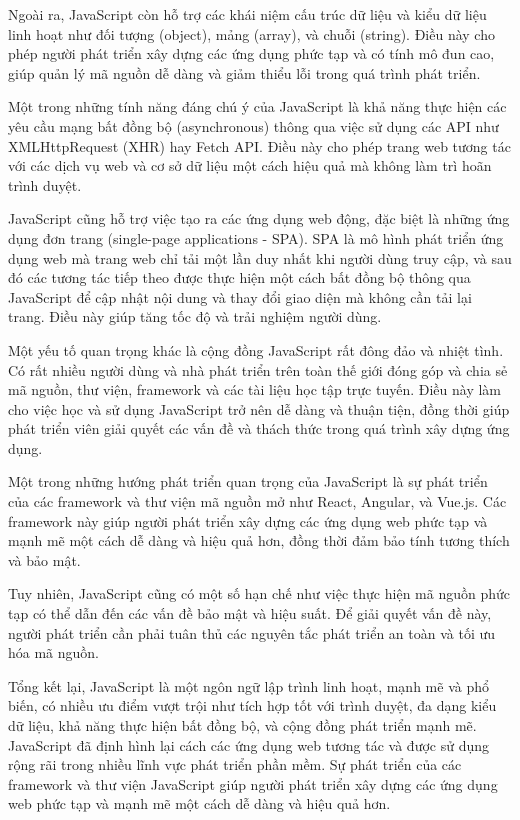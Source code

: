 Ngoài ra, JavaScript còn hỗ trợ các khái niệm cấu trúc dữ liệu và kiểu dữ liệu linh hoạt như đối tượng (object), mảng (array), và chuỗi (string). Điều này cho phép người phát triển xây dựng các ứng dụng phức tạp và có tính mô đun cao, giúp quản lý mã nguồn dễ dàng và giảm thiểu lỗi trong quá trình phát triển.

Một trong những tính năng đáng chú ý của JavaScript là khả năng thực hiện các yêu cầu mạng bất đồng bộ (asynchronous) thông qua việc sử dụng các API như XMLHttpRequest (XHR) hay Fetch API. Điều này cho phép trang web tương tác với các dịch vụ web và cơ sở dữ liệu một cách hiệu quả mà không làm trì hoãn trình duyệt. \cite{js_2}

JavaScript cũng hỗ trợ việc tạo ra các ứng dụng web động, đặc biệt là những ứng dụng đơn trang (single-page applications - SPA). SPA là mô hình phát triển ứng dụng web mà trang web chỉ tải một lần duy nhất khi người dùng truy cập, và sau đó các tương tác tiếp theo được thực hiện một cách bất đồng bộ thông qua JavaScript để cập nhật nội dung và thay đổi giao diện mà không cần tải lại trang. Điều này giúp tăng tốc độ và trải nghiệm người dùng.

Một yếu tố quan trọng khác là cộng đồng JavaScript rất đông đảo và nhiệt tình. Có rất nhiều người dùng và nhà phát triển trên toàn thế giới đóng góp và chia sẻ mã nguồn, thư viện, framework và các tài liệu học tập trực tuyến. Điều này làm cho việc học và sử dụng JavaScript trở nên dễ dàng và thuận tiện, đồng thời giúp phát triển viên giải quyết các vấn đề và thách thức trong quá trình xây dựng ứng dụng.

Một trong những hướng phát triển quan trọng của JavaScript là sự phát triển của các framework và thư viện mã nguồn mở như React, Angular, và Vue.js. Các framework này giúp người phát triển xây dựng các ứng dụng web phức tạp và mạnh mẽ một cách dễ dàng và hiệu quả hơn, đồng thời đảm bảo tính tương thích và bảo mật.

Tuy nhiên, JavaScript cũng có một số hạn chế như việc thực hiện mã nguồn phức tạp có thể dẫn đến các vấn đề bảo mật và hiệu suất. Để giải quyết vấn đề này, người phát triển cần phải tuân thủ các nguyên tắc phát triển an toàn và tối ưu hóa mã nguồn.

Tổng kết lại, JavaScript là một ngôn ngữ lập trình linh hoạt, mạnh mẽ và phổ biến, có nhiều ưu điểm vượt trội như tích hợp tốt với trình duyệt, đa dạng kiểu dữ liệu, khả năng thực hiện bất đồng bộ, và cộng đồng phát triển mạnh mẽ. JavaScript đã định hình lại cách các ứng dụng web tương tác và được sử dụng rộng rãi trong nhiều lĩnh vực phát triển phần mềm. Sự phát triển của các framework và thư viện JavaScript giúp người phát triển xây dựng các ứng dụng web phức tạp và mạnh mẽ một cách dễ dàng và hiệu quả hơn.

